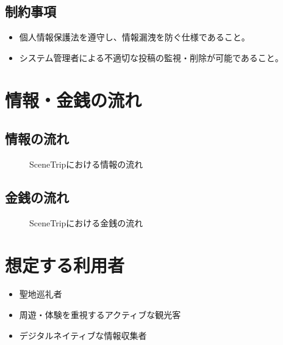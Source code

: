 \documentclass{docs}
\begin{document}
\subsection{制約事項}
\begin{itemize}
    \item 個人情報保護法を遵守し、情報漏洩を防ぐ仕様であること。
    \item システム管理者による不適切な投稿の監視・削除が可能であること。
\end{itemize}

\section{情報・金銭の流れ}
\subsection{情報の流れ}
\begin{figure}[H]
    \centering
    \caption{SceneTripにおける情報の流れ}
    \label{fig:info}
\end{figure}

\subsection{金銭の流れ}
\begin{figure}[H]
    \centering
    \caption{SceneTripにおける金銭の流れ}
    \label{fig:money}
\end{figure}


\section{想定する利用者}
\begin{itemize}
    \item 聖地巡礼者
    \item 周遊・体験を重視するアクティブな観光客
    \item デジタルネイティブな情報収集者
\end{itemize}
\end{document}
